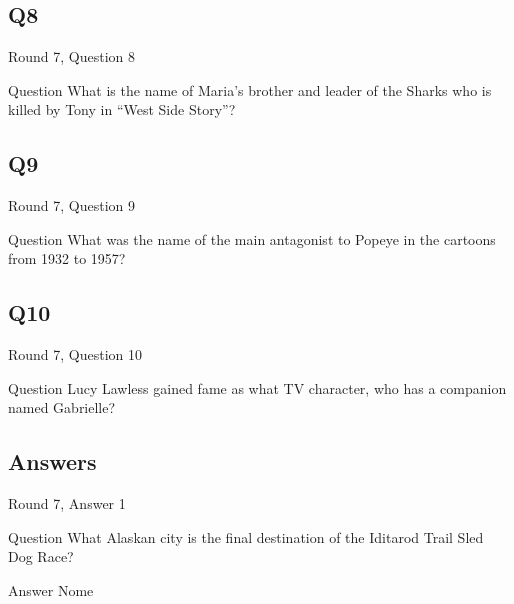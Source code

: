 \documentclass[11pt]{beamer}
\begin{document}
\subsection*{Q8}
\begin{frame}[t]{Round 7, Question 8}
\vspace{2em}
\begin{block}{Question}
What is the name of Maria's brother and leader of the Sharks who is killed by Tony in ``West Side Story''\@?
\end{block}
\end{frame}
    

\subsection*{Q9}
\begin{frame}[t]{Round 7, Question 9}
\vspace{2em}
\begin{block}{Question}
What was the name of the main antagonist to Popeye in the cartoons from 1932 to 1957\@?
\end{block}
\end{frame}
    

\subsection*{Q10}
\begin{frame}[t]{Round 7, Question 10}
\vspace{2em}
\begin{block}{Question}
Lucy Lawless gained fame as what TV character, who has a companion named Gabrielle\@?
\end{block}
\end{frame}
    
\subsection{Answers}

\begin{frame}[t]{Round 7, Answer 1}
\vspace{2em}
\begin{block}{Question}
What Alaskan city is the final destination of the Iditarod Trail Sled Dog Race\@?
\end{block}
\pause{}
\begin{block}{Answer}
Nome
\end{block}
\end{frame}
    
\end{document}
